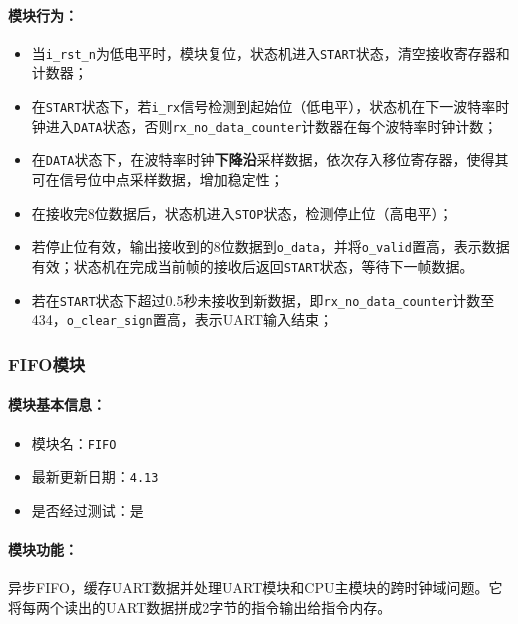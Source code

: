 \documentclass[lang=cn,a4paper,newtx]{elegantpaper}
\begin{document}
\paragraph{模块行为：}
\begin{itemize}
  \item 当\texttt{i\_rst\_n}为低电平时，模块复位，状态机进入\texttt{START}状态，清空接收寄存器和计数器；
  \item 在\texttt{START}状态下，若\texttt{i\_rx}信号检测到起始位（低电平），状态机在下一波特率时钟进入\texttt{DATA}状态，否则\texttt{rx\_no\_data\_counter}计数器在每个波特率时钟计数；
  \item 在\texttt{DATA}状态下，在波特率时钟\textbf{下降沿}采样数据，依次存入移位寄存器，使得其可在信号位中点采样数据，增加稳定性；
  \item 在接收完8位数据后，状态机进入\texttt{STOP}状态，检测停止位（高电平）；
  \item 若停止位有效，输出接收到的8位数据到\texttt{o\_data}，并将\texttt{o\_valid}置高，表示数据有效；状态机在完成当前帧的接收后返回\texttt{START}状态，等待下一帧数据。
  \item 若在\texttt{START}状态下超过0.5秒未接收到新数据，即\texttt{rx\_no\_data\_counter}计数至434，\texttt{o\_clear\_sign}置高，表示UART输入结束；
\end{itemize}
\subsubsection{FIFO模块}
\paragraph{模块基本信息：}
\begin{itemize}
  \item 模块名：\texttt{FIFO}
  \item 最新更新日期：\texttt{4.13}
  \item 是否经过测试：是
\end{itemize}
\paragraph{模块功能：}
异步FIFO，缓存UART数据并处理UART模块和CPU主模块的跨时钟域问题。它将每两个读出的UART数据拼成2字节的指令输出给指令内存。
\end{document}
